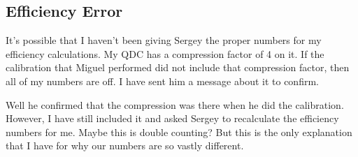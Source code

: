 \subsection{Efficiency Error}
It's possible that I haven't been giving Sergey the proper numbers for my 
efficiency calculations. My QDC has a compression factor of 4 on it. If the 
calibration that Miguel performed did not include that compression factor, then
all of my numbers are off. I have sent him a message about it to confirm.

Well he confirmed that the compression was there when he did the calibration. 
However, I have still included it and asked Sergey to recalculate the efficiency
numbers for me. Maybe this is double counting? But this is the only explanation 
that I have for why our numbers are so vastly different. 
